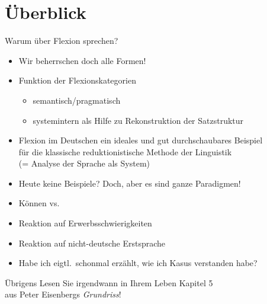 
\section{Überblick}


\begin{frame}
  {Warum über Flexion sprechen?}
  \pause
  \begin{itemize}[<+->]
    \item \alert{Wir beherrschen doch alle Formen!}
      \Halbzeile
    \item Funktion der Flexionskategorien
      \begin{itemize}
        \item semantisch\slash pragmatisch
        \item \alert{systemintern} als Hilfe zu \alert{Rekonstruktion der Satzstruktur}
      \end{itemize}
      \Halbzeile
    \item Flexion im Deutschen ein ideales und gut durchschaubares Beispiel\\
      für die klassische \alert{reduktionistische} Methode der Linguistik\\
      (= Analyse der Sprache als \alert{System})
      \Halbzeile
    \item Heute keine Beispiele? Doch, aber es sind ganze Paradigmen!
      \Halbzeile
    \item \alert{Können} vs.\ 
    \item Reaktion auf Erwerbsschwierigkeiten
    \item Reaktion auf nicht-deutsche Erstsprache
      \Halbzeile
    \item Habe ich eigtl.\ schonmal erzählt, wie ich Kasus verstanden habe?
  \end{itemize}
\end{frame}

\begin{frame}
  {Übrigens}
  \pause
  \centering
  \Large
  \alert{Lesen Sie irgendwann in Ihrem Leben Kapitel 5\\
    aus Peter Eisenbergs \textit{Grundriss}!}\\
    \citep[145--200]{Eisenberg2013a}
\end{frame}

